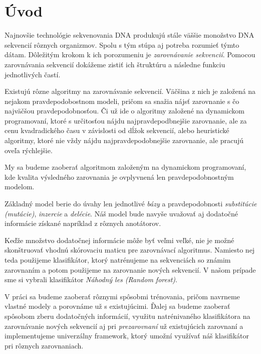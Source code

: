 \chapter*{Úvod}


Najnovšie technológie sekvenovania DNA produkujú stále väššie monožstvo DNA sekvencií rôznych organizmov. Spolu s tým stúpa aj potreba rozumieť týmto dátam. 
Dôležitým krokom k ich porozumeniu je \textit{zarovnávanie sekvencií}. Pomocou zarovnávania sekvencií dokážeme zistiť ich štruktúru a následne funkciu jednotlivých častí.

Existujú rôzne algoritmy na zarovnávanie sekvencií. Väčšina z nich je založená na nejakom pravdepodobostnom modeli, pričom sa snažia nájsť zarovnanie s čo najväčšou pravdepodobnosťou. Či už ide o algoritmy založené na dynamickom programovaní, ktoré s určitosťou nájdu najpravdepodbnejšie zarovnanie, ale za cenu kvadradického času v závislosti od dĺžok sekvencií, alebo heuristické algoritmy, ktoré nie vždy nájdu najpravdepodobnejšie zarovnanie, ale pracujú oveľa rýchlejšie.

My sa budeme zaoberať algoritmom založeným na dynamickom programovaní, kde kvalita výsledného zarovnania je ovplyvnená len pravdepodobnostným modelom.

Základný model berie do úvahy len jednotlivé \textit{bázy} a pravdepodobnosti \textit{substitúcie (mutácie)}, \textit{inzercie} a \textit{delécie}.
Náš model bude navyše uvažovať aj dodatočné informácie získané napríklad z rôznych anotátorov.

Keďže množstvo dodatočnej informácie môže byť veľmi veľké, %
nie je možné skonštruovať vhodnú skórovaciu maticu pre zarovnávací algoritmus.
Namiesto nej teda použijeme klasifikátor, ktorý natrénujeme na sekvenciách so známim zarovnaním a potom použijeme na zarovnanie nových sekvencií. V našom prípade sme si vybrali klasifikátor \textit{Náhodný les (Random forest)}.

V práci sa budeme zaoberať rôznymi spôsobmi trénovania, pričom navrneme vlastné modely a porovnáme už s existujúcimi. Ďalej sa budeme zaoberať spôsobom zberu dodatočných informácií, využitu natrénivaného klasifikátora na zarovnávanie nových sekvencií aj pri \textit{prezarovnaní} už existujúcich zarovnaní a implementujeme univerzálny framework, ktorý umožní využívať náš klasifikátor pri rôznych zarovnaniach.


